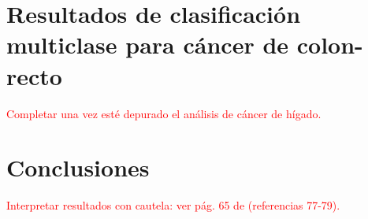 \section{Resultados de clasificación multiclase para cáncer de colon-recto}

\textcolor{red}{Completar una vez esté depurado el análisis de cáncer de hígado.}

\section{Conclusiones}

\textcolor{red}{Interpretar resultados con cautela: ver pág. 65 de \cite{CastilloSecilla2020} (referencias 77-79).}\\
